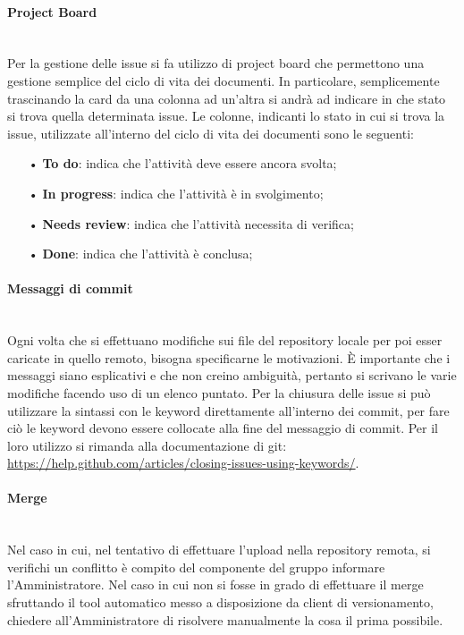{\paragraph{Project Board}\mbox{}\\
\label{sec:projectboard}
Per la gestione delle {issue} si fa utilizzo di {project board} che permettono una gestione semplice del ciclo di vita dei documenti. 
In particolare, semplicemente trascinando la {card} da una colonna ad un'altra si andrà ad indicare in che stato si trova quella determinata issue.
Le colonne, indicanti lo stato in cui si trova la issue, utilizzate all'interno del ciclo di vita dei documenti sono le seguenti:
\begin{itemize}
\item[•] \textbf{To do}: indica che l'attività deve essere ancora svolta;
\item[•] \textbf{In progress}: indica che l'attività è in svolgimento;
\item[•] \textbf{Needs review}: indica che l'attività necessita di verifica;
\item[•] \textbf{Done}: indica che l'attività è conclusa;
\end{itemize}
\paragraph{Messaggi di commit}\mbox{}\\
Ogni volta che si effettuano modifiche sui file del repository locale per poi esser caricate in
quello remoto, bisogna specificarne le motivazioni. \uppercase{è} importante che i messaggi siano esplicativi e che non creino ambiguità, pertanto si scrivano le varie modifiche facendo uso di un elenco puntato.
Per la chiusura delle issue si può utilizzare la sintassi con le {keyword} direttamente all'interno dei {commit}, per fare ciò le keyword devono essere collocate alla fine del messaggio di commit. Per il loro utilizzo si rimanda alla documentazione di {git}: \url{https://help.github.com/articles/closing-issues-using-keywords/}. 

\paragraph{Merge}\mbox{}\\
Nel caso in cui, nel tentativo di effettuare l'upload nella repository remota, si verifichi un {conflitto} è compito del componente del gruppo informare l'Amministratore. Nel caso in cui non si fosse in grado di effettuare il {merge} sfruttando il tool automatico messo a disposizione da client di versionamento, chiedere all'Amministratore di risolvere manualmente la cosa il prima possibile.


}
